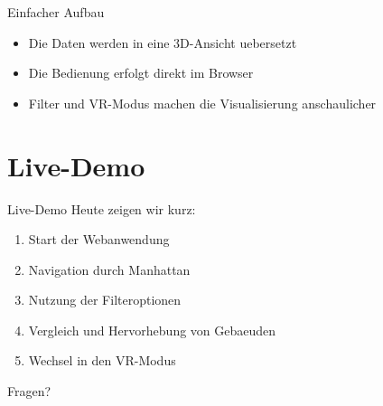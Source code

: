 \documentclass[
amberg, %
toc=fancy, %
footlinebox, %
nometaot %
]{OTHAWbeamer}
\begin{document}
    \begin{frame}{Einfacher Aufbau}
        \begin{center}
        \end{center}

        \vspace{0.6cm}

        \begin{itemize}
            \item Die Daten werden in eine 3D-Ansicht uebersetzt
            \item Die Bedienung erfolgt direkt im Browser
            \item Filter und VR-Modus machen die Visualisierung anschaulicher
        \end{itemize}
    \end{frame}

    \section{Live-Demo}

    \begin{frame}{Live-Demo}
        Heute zeigen wir kurz:

        \vspace{0.25cm}

        \begin{enumerate}
            \item Start der Webanwendung
            \item Navigation durch Manhattan
            \item Nutzung der Filteroptionen
            \item Vergleich und Hervorhebung von Gebaeuden
            \item Wechsel in den VR-Modus
        \end{enumerate}

        \vspace{0.7cm}

        \begin{center}
            \Huge Fragen?
        \end{center}
    \end{frame}
\end{document}
